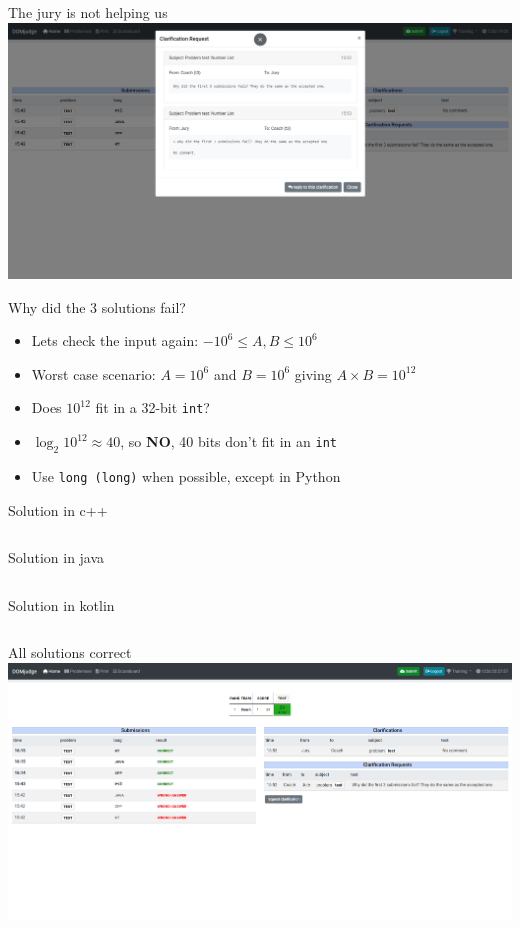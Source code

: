 \documentclass[11pt,pdf, aspectratio=169]{beamer}
\begin{document}
  \begin{frame}{The jury is not helping us}
    \includegraphics[width=\linewidth]{images/session-1/domjudge-clar-4}
  \end{frame}
  \begin{frame}{Why did the 3 solutions fail?}
    \begin{itemize}
      \item <1-> Lets check the input again: $-10^{6} \leq A,B \leq 10^{6}$
      \item <2-> Worst case scenario: $A=10^6$ and $B=10^6$ giving  $A \times B = 10^{12}$
      \item <3-> Does $10^{12}$ fit in a 32-bit \texttt{int}?
      \item <4-> $\log_2 10^{12} \approx 40$, so \textbf{NO}, 40 bits don't fit in an \texttt{int}
      \item <5-> Use \texttt{long (long)} when possible, except in Python
    \end{itemize}
  \end{frame}
  \begin{frame}[containsverbatim]{Solution in c++}
    \inputminted{c++}{code/session-1/c++/example.cpp}
  \end{frame}
  \begin{frame}[containsverbatim]{Solution in java}
    \inputminted{java}{code/session-1/java/example.java}
  \end{frame}
  \begin{frame}[containsverbatim]{Solution in kotlin}
    \inputminted{kotlin}{code/session-1/kotlin/example.kt}
  \end{frame}
  \begin{frame}{All solutions correct}
    \includegraphics[width=\linewidth]{images/session-1/domjudge-all-correct}
  \end{frame}
\end{document}
